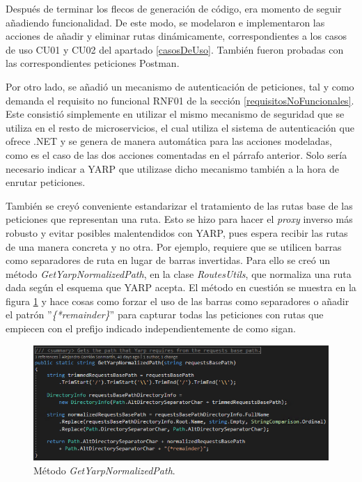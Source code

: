 \documentclass[11pt,spanish,listoffigures]{tfgetsinf}
\begin{document}
Después de terminar los flecos de generación de código, era momento de seguir añadiendo funcionalidad. De este modo, se modelaron e implementaron las acciones de añadir y eliminar rutas dinámicamente, correspondientes a los casos de uso CU01 y CU02 del apartado \ref{casosDeUso}. También fueron probadas con las correspondientes peticiones Postman.

Por otro lado, se añadió un mecanismo de autenticación de peticiones, tal y como demanda el requisito no funcional RNF01 de la sección \ref{requisitosNoFuncionales}. Este consistió simplemente en utilizar el mismo mecanismo de seguridad que se utiliza en el resto de microservicios, el cual utiliza el sistema de autenticación que ofrece .NET y se genera de manera automática para las acciones modeladas, como es el caso de las dos acciones comentadas en el párrafo anterior. Solo sería necesario indicar a YARP que utilizase dicho mecanismo también a la hora de enrutar peticiones.

También se creyó conveniente estandarizar el tratamiento de las rutas base de las peticiones que representan una ruta. Esto se hizo para hacer el \emph{proxy} inverso más robusto y evitar posibles malentendidos con YARP, pues espera recibir las rutas de una manera concreta y no otra. Por ejemplo, requiere que se utilicen barras como separadores de ruta en lugar de barras invertidas. Para ello se creó un método \emph{GetYarpNormalizedPath}, en la clase \emph{RoutesUtils}, que normaliza una ruta dada según el esquema que YARP acepta. El método en cuestión se muestra en la figura \ref{getYarpNormalizedPath} y hace cosas como forzar el uso de las barras como separadores o añadir el patrón ''\emph{\{*remainder\}}'' para capturar todas las peticiones con rutas que empiecen con el prefijo indicado independientemente de como sigan.

\begin{figure}[ht]
\centering
\includegraphics[width=1\textwidth]{imagenes/getYarpNormalizedPath}
\caption{Método \emph{GetYarpNormalizedPath}.}
	\label{getYarpNormalizedPath}
\end{figure}
\end{document}
